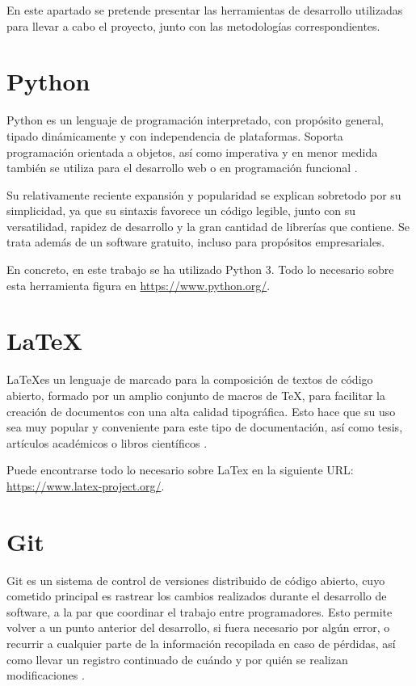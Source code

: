 
En este apartado se pretende presentar las herramientas de desarrollo utilizadas para llevar a cabo el proyecto, junto con las metodologías correspondientes.


\section{Python}

Python es un lenguaje de programación interpretado, con propósito general, tipado dinámicamente y con independencia de plataformas. Soporta programación orientada a objetos, así como imperativa y en menor medida también se utiliza para el desarrollo web o en programación funcional \cite{python}.

Su relativamente reciente expansión y popularidad se explican sobretodo por su simplicidad, ya que su sintaxis favorece un código legible, junto con su versatilidad, rapidez de desarrollo y la gran cantidad de librerías que contiene. Se trata además de un software gratuito, incluso para propósitos empresariales.

En concreto, en este trabajo se ha utilizado Python 3. Todo lo necesario sobre esta herramienta figura en \url{https://www.python.org/}.


\section{LaTeX}

\LaTeX\space es un lenguaje de marcado para la composición de textos de código abierto, formado por un amplio conjunto de macros de TeX, para facilitar la creación de documentos con una alta calidad tipográfica. Esto hace que su uso sea muy popular y conveniente para este tipo de documentación, así como tesis, artículos académicos o libros científicos \cite{wiki:latex}.

Puede encontrarse todo lo necesario sobre LaTex en la siguiente URL: \url{https://www.latex-project.org/}.


\section{Git}

Git es un sistema de control de versiones distribuido de código abierto, cuyo cometido principal es rastrear los cambios realizados durante el desarrollo de software, a la par que coordinar el trabajo entre programadores. Esto permite volver a un punto anterior del desarrollo, si fuera necesario por algún error, o recurrir a cualquier parte de la información recopilada en caso de pérdidas, así como llevar un registro continuado de cuándo y por quién se realizan modificaciones \cite{wiki:git}.

